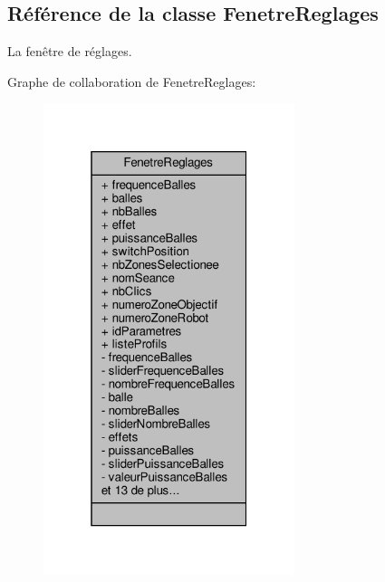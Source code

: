 \hypertarget{class_fenetre_reglages}{}\subsection{Référence de la classe Fenetre\+Reglages}
\label{class_fenetre_reglages}


La fenêtre de réglages.  




Graphe de collaboration de Fenetre\+Reglages\+:\nopagebreak
\begin{figure}[H]
\begin{center}
\leavevmode
\includegraphics[width=208pt]{class_fenetre_reglages__coll__graph}
\end{center}
\end{figure}
